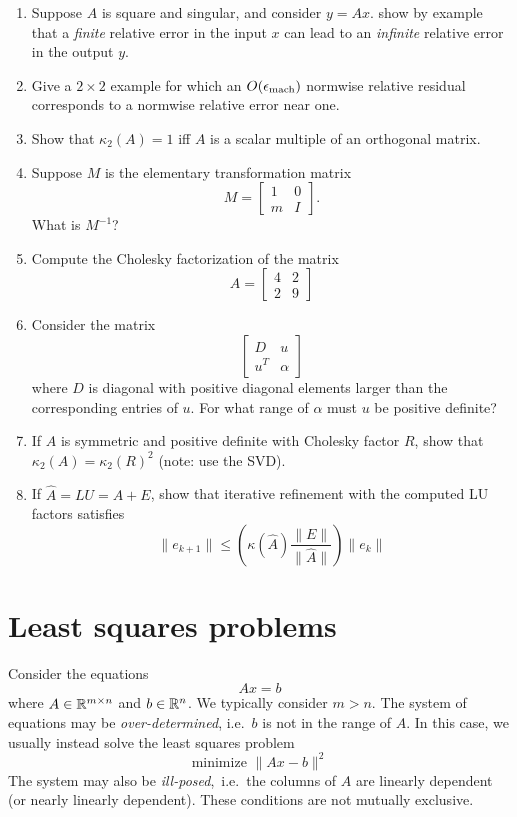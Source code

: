 \documentclass[12pt, leqno]{article}
\begin{document}
\begin{enumerate}
\item
  Suppose $A$ is square and singular, and consider $y = Ax$.
  show by example that a {\em finite} relative error in the input
  $x$ can lead to an {\em infinite} relative error in the output $y$.
\item
  Give a $2 \times 2$ example for which an $O(\epsilon_{\mathrm{mach}})$ normwise
  relative residual corresponds to a normwise relative error near one.
\item
  Show that $\kappa_2(A) = 1$ iff $A$ is a scalar multiple of an
  orthogonal matrix.
\item
  Suppose $M$ is the elementary transformation matrix
  \[
    M = \begin{bmatrix} 1 & 0 \\ m & I \end{bmatrix}.
  \]
  What is $M^{-1}$?
\item
  Compute the Cholesky factorization of the matrix
  \[
  A = \begin{bmatrix}
         4 & 2 \\
         2 & 9
      \end{bmatrix}
  \]
\item
  Consider the matrix
  \[
  \begin{bmatrix}
    D & u \\
    u^T & \alpha
  \end{bmatrix}
  \]
  where $D$ is diagonal with positive diagonal elements larger than the
  corresponding entries of $u$.  For what range of $\alpha$ must
  $u$ be positive definite?
\item
  If $A$ is symmetric and positive definite with Cholesky factor $R$,
  show that $\kappa_2(A) = \kappa_2(R)^2$ (note: use the SVD).
\item
  If $\hat{A} = LU = A+E$, show that iterative refinement with
  the computed LU factors satisfies
  \[
    \|e_{k+1}\| \leq
    \left( \kappa(\hat{A}) \frac{\|E\|}{\|\hat{A}\|} \right) \|e_k\|
  \]
\end{enumerate}

\section{Least squares problems}

Consider the equations
\[
  Ax = b
\]
where $A \in \mathbb{R}^{m \times n}$ and $b \in \mathbb{R}^n$.  We typically
consider $m > n$.  The system of equations may be {\em
  over-determined}, i.e.~$b$ is not in the range of $A$.  In this
case, we usually instead solve the least squares problem
\[
  \mbox{minimize } \|Ax-b\|^2
\]
The system may also be {\em ill-posed},~i.e.~the columns of $A$ are
linearly dependent (or nearly linearly dependent).  These conditions
are not mutually exclusive.
\end{document}
